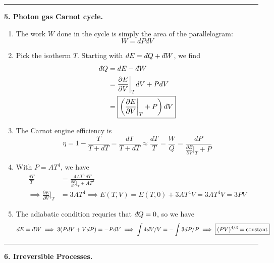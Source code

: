 \documentclass{article}
\theoremstyle{definition}
\newcommand{\p}{\partial}
\def\dbar{{\mkern3mu\mathchar'26\mkern-12mu   d}}
\newcommand{\f}[2]{\frac{#1}{#2}}
\newcommand{\lp}{\left(}
\newcommand{\rp}{\right)}
\begin{document}
\hrule

$\,$\\



\noindent \textbf{5. Photon gas Carnot cycle.} 


\begin{enumerate}[label=(\alph*)]
	\item The work $W$ done in the cycle is simply the area of the parallelogram:
	\begin{equation*}
	\boxed{W = dPdV}
	\end{equation*}
	
	
	\item Pick the isotherm $T$. Starting with $dE = \dbar Q + \dbar W$, we find 
	\begin{align*}
	\dbar Q &= dE -  \dbar W \\
	&= \f{\p E}{\p V}\bigg\vert_{T} dV  + PdV \\
	&= \boxed{\lp  \f{\p E}{\p V}\bigg\vert_{T} + P \rp dV}
	\end{align*}
	
	
	\item The Carnot engine efficiency is 
	\begin{equation*}
	\eta = 1 - \f{T}{T+dT} = \f{dT}{T+dT} \approx \boxed{\f{dT}{T}} = \f{W}{Q} = \boxed{\f{dP}{\f{\p E}{\p V}\big\vert_{T} + P }}
	\end{equation*}
	
	
	\item With $P = AT^4$, we have
	\begin{align*}
	\f{dT}{T} &= \f{4AT^3\,dT}{\f{\p E}{\p V}\big\vert_{T} + AT^4 } \\
	\implies \f{\p E}{\p V}\bigg\vert_{T} &= 3AT^4  \implies \boxed{E(T,V)} = E(T,0) + 3AT^4V = \boxed{3AT^4 V} = 3PV
	\end{align*}
	
	
	\item The adiabatic condition requries that $\dbar Q =0$, so we have
	\begin{equation*}
	dE = \dbar W \implies 3(PdV + VdP) = -PdV \implies \int 4dV/V = -\int 3dP/P \implies  \boxed{(PV)^{4/3} = \text{constant}}
	\end{equation*}
\end{enumerate}


\hrule

$\,$\\



\noindent \textbf{6. Irreversible Processes.}
\end{document}
